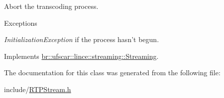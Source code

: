 Abort the transcoding process. 


\begin{DoxyExceptions}{Exceptions}
\item[{\em InitializationException}]if the process hasn't begun. \end{DoxyExceptions}


Implements \hyperlink{classbr_1_1ufscar_1_1lince_1_1streaming_1_1Streaming_a6fa79a5e9bac37069e91d77be9ef4a54}{br::ufscar::lince::streaming::Streaming}.



The documentation for this class was generated from the following file:\begin{DoxyCompactItemize}
\item 
include/\hyperlink{RTPStream_8h}{RTPStream.h}\end{DoxyCompactItemize}

